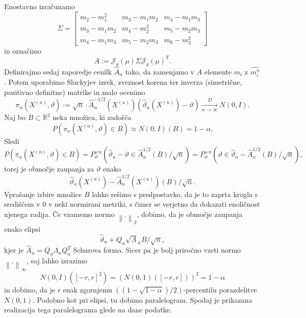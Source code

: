 \documentclass[ letterpaper, titlepage, fleqn]{article}
\newcommand{\R}{\mathbb R}
\newcommand{\J}{\mathscr J}
\newcommand{\norm}[1]{\left\lVert#1\right\rVert}
\begin{document}
\subsection{}
Enostavno izračunamo
$$\Sigma = 
\begin{bmatrix}
m_2 - m_1^2 & m_3 - m_1m_2 & m_4 - m_1m_3 \\
m_3 - m_1m_2 & m_4 - m_2^2 & m_5 - m_2m_3 \\
m_4 - m_1m_3 & m_5 - m_2m_3 & m_6 - m_3^2 
\end{bmatrix}
$$
in označimo
$$A := \J_g(\mu) \Sigma \J_g(\mu)^T.$$
Definirajmo sedaj zaporedje cenilk $\hat{A}_n$ tako, da zamenjamo v $A$  elemente $m_i$ z $\hat{m_i^n}$.
Potem uporabimo Sluckyjev izrek, zveznost korena ter inverza (simetrične, pozitivno definitne) matrike in malo ocenimo
$$\pi_n(X^{(n)}, \vartheta) := \sqrt{n} \cdot \hat{A}_n^{-1/2}(X^{(n)}) \left(\hat{\vartheta}_n(X^{(n)}) - \vartheta\right) \xrightarrow[n\to\infty]{D} N(0, I).$$
Naj bo $B \subset \R^2$ neka množica, ki zadošča
$$P(\pi_n(X^{(n)}, \vartheta) \in B) \approx N(0,I)(B) = 1 - \alpha.$$
Sledi
$$P(\pi_n(X^{(n)}, \vartheta) \in B) = P_{\vartheta}^{\times n}(\hat{\vartheta}_n - \vartheta \in \hat{A}_n^{1/2}\left(B\right) / \sqrt{n}) = P_{\vartheta}^{\times n}(\vartheta \in \hat{\vartheta}_n - \hat{A}_n^{1/2}\left(B\right) / \sqrt{n}),$$
torej je območje zaupanja za $\vartheta$ enako
$$\hat{\vartheta}_n(X^{(n)}) - \hat{A}_n^{1/2}(X^{(n)})\left(B\right) / \sqrt{n}.$$
Vprašanje izbire množice $B$ lahko rešimo s predpostavko, da je to zaprta krogla s središčem v $0$ v neki normirani metriki, 
s čimer se verjetno da dokazati enoličnost njenega radija. Če vzamemo normo $\norm{.}_2$, dobimo, da je območje zaupanja enako elipsi
$$\hat{\vartheta}_n + Q_n \sqrt{\Lambda}_n B / \sqrt{n},$$
kjer je $\hat{A}_n = Q_n \Lambda_n Q_n^T$ Schurova forma. Sicer pa je bolj priročno vzeti normo $\norm{.}_\infty$, saj lahko izrazimo 
\begin{equation*}
N(0,I)\left([-r,r]^2\right) = \left(N(0,1)([-r,r])\right)^2 = 1 - \alpha 
\end{equation*}
in dobimo, da je $r$ enak zgornjemu $((1 - \sqrt{1-\alpha})/2)$-percentilu porazdelitve $N(0,1)$. Podobno kot pri elipsi, tu dobimo paralelogram. Spodaj je prikazana realizacija tega paralelograma glede na dane podatke.
\end{document}
